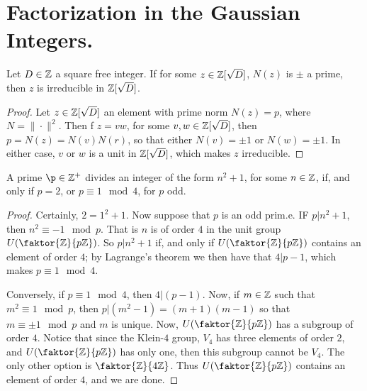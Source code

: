 \section{Factorization in the Gaussian Integers.}

\begin{lemma}\label{2.4.1}
    Let $D \in \mathbb{Z}$ a square free integer. If for some $z \in \mathbb{Z}[\sqrt{D}]$,
    $N(z)$ is $\pm$ a prime, then  $z$ is irreducible in
    $\mathbb{Z}[\sqrt{D}]$.
\end{lemma}
\begin{proof}
    Let $z \in \mathbb{Z}[\sqrt{D}]$ an element with prime norm $N(z)=p$, where
    $N=\|\cdot\|^2$. Then f  $z=vw$, for some  $v,w \in \mathbb{Z}[\sqrt{D}]$, then
    $p=N(z)=N(v)N(r)$, so that either $N(v)=\pm 1$ or $N(w)=\pm 1$. In either
    case, $v$ or  $w$ is a unit in  $\mathbb{Z}[\sqrt{D}]$, which makes $z$ irreducible.
\end{proof}

\begin{lemma}\label{2.4.2}
    A prime $\p \in \Z^+$ divides an integer of the form  $n^2+1$, for some  $n
    \in \mathbb{Z}$, if, and only if  $p=2$, or  $p \equiv 1 \mod{4}$, for $p$ odd.
\end{lemma}
\begin{proof}
    Certainly, $2=1^2+1$. Now suppose that  $p$ is an odd prim.e. IF  $p|n^2+1$,
    then  $n^2 \equiv -1 \mod{p}$. That is $n$ is of order $4$ in the unit group
    $U(\faktor{\Z}{p\Z})$. So $p|n^2+1$ if, and only if  $U(\faktor{\Z}{p\Z})$
    contains an element of order $4$; by Lagrange's theorem we then have that
    $4|p-1$, which makes $p \equiv 1 \mod{4}$.

    Conversely, if $p \equiv 1 \mod{4}$, then $4|(p-1)$. Now, if $m \in \mathbb{Z}$ such
    that  $m^2 \equiv 1 \mod{p}$, then $p|(m^2-1)=(m+1)(m-1)$ so that $m \equiv
    \pm 1 \mod{p}$ and $m$ is unique. Now,  $U(\faktor{\Z}{p\Z})$ has a subgroup
    of order $4$. Notice that since the Klein-$4$ group, $V_4$ has three elements
    of order $2$, and  $U(\faktor{\Z}{p\Z})$ has only one, then this subgroup
    cannot be $V_4$. The only other option is $\faktor{\Z}{4\Z}$. Thus
    $U(\faktor{\Z}{p\Z})$ contains an element of order $4$, and we are done.
\end{proof}

